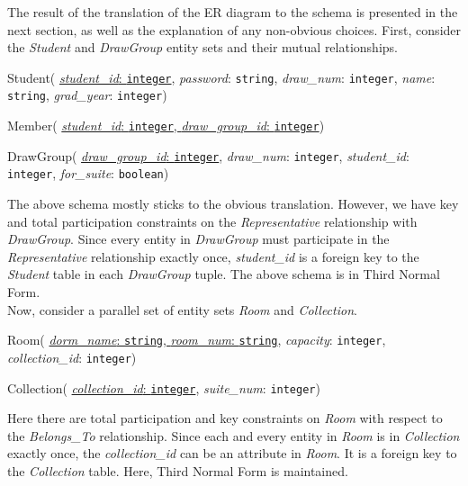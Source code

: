 The result of the translation of the ER diagram to the schema is presented in
the next section, as well as the explanation of any non-obvious choices. First,
consider the \emph{Student} and \emph{DrawGroup} entity sets and their mutual
relationships.

\begin{description}
  \item Student(
        \ul{\emph{student\_id}: \texttt{integer}},
        \emph{password}: \texttt{string},
        \emph{draw\_num}: \texttt{integer},
        \emph{name}: \texttt{string},
        \emph{grad\_year}: \texttt{integer})

  \item Member(
        \ul{\emph{student\_id}: \texttt{integer},
        \emph{draw\_group\_id}: \texttt{integer}})

  \item DrawGroup(
        \ul{\emph{draw\_group\_id}: \texttt{integer}},
        \emph{draw\_num}: \texttt{integer},
        \emph{student\_id}: \texttt{integer},
        \emph{for\_suite}: \texttt{boolean})
\end{description}

The above schema mostly sticks to the obvious translation.  However, we have key
and total participation constraints on the \emph{Representative} relationship
with \emph{DrawGroup}. Since every entity in \emph{DrawGroup} must participate
in the \emph{Representative} relationship exactly once, \emph{student\_id} is a
foreign key to the \emph{Student} table in each \emph{DrawGroup} tuple. The
above schema is in Third Normal Form. \\

Now, consider a parallel set of entity sets \emph{Room} and \emph{Collection}.

\begin{description}
  \item Room(
        \ul{\emph{dorm\_name}: \texttt{string},
        \emph{room\_num}: \texttt{string}},
        \emph{capacity}: \texttt{integer},
        \emph{collection\_id}: \texttt{integer})

  \item Collection(
        \ul{\emph{collection\_id}: \texttt{integer}},
        \emph{suite\_num}: \texttt{integer})
\end{description}

Here there are total participation and key constraints on \emph{Room} with
respect to the \emph{Belongs\_To} relationship.  Since each and every entity in
\emph{Room} is in \emph{Collection} exactly once, the \emph{collection\_id} can
be an attribute in \emph{Room}. It is a foreign key to the
\emph{Collection} table. Here, Third Normal Form is maintained.

